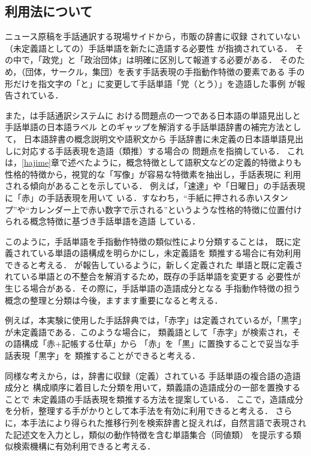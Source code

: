 \subsection {利用法について}

ニュース原稿を手話通訳する現場サイドから，市販の辞書に収録
されていない（未定義語としての）手話単語を新たに造語する必要性
が指摘されている\cite{Shigaki1991}．
その中で，「政党」と「政治団体」は明確に区別して報道する必要がある．
そのため，（団体，サークル，集団）を表す手話表現の手指動作特徴の要素である
手の形だけを指文字の「と」に変更して手話単語「党（とう）」を造語した事例
が報告されている．

また，\cite{Tokuda1998}は手話通訳システムに
おける問題点の一つである日本語の単語見出しと手話単語の日本語ラベル
とのギャップを解消する手話単語辞書の補完方法として，
日本語辞書の概念説明文や語釈文から
手話辞書に未定義の日本語単語見出しに対応する手話表現を造語（類推）する場合の
問題点を指摘している．
これは，\ref{hajime}章で述べたように，概念特徴として語釈文などの定義的特徴よりも
性格的特徴から，視覚的な「写像」が容易な特徴素を抽出し，手話表現に
利用される傾向があることを示している．
例えば，「速達」や「日曜日」の手話表現に「赤」の手話表現を用いて
いる．すなわち，``手紙に押される赤いスタンプ''や``カレンダー上で赤い数字で示される''というような性格的特徴に位置付けられる概念特徴に基づき手話単語を造語
している．

このように，手話単語を手指動作特徴の類似性により分類することは，
既に定義されている単語の語構成を明らかにし，未定義語を
類推する場合に有効利用できると考える．
\cite{Honna1994}が報告しているように，新しく定義された
単語と既に定義されている単語との不整合を解消するため，既存の手話単語を変更する
必要性が生じる場合がある．その際に，手話単語の造語成分となる
手指動作特徴の担う概念の整理と分類は今後，ますます重要になると考える．

例えば，本実験に使用した手話辞典では，「赤字」は定義されているが，「黒字」が未定義語である．このような場合に，
類義語として「赤字」が検索され，その語構成「赤+記帳する仕草」から
「赤」を「黒」に置換することで妥当な手話表現「黒字」\cite{Ito1982}を
類推することができると考える．

同様な考えから，\cite{Adachi1993}は，辞書に収録（定義）されている
手話単語の複合語の造語成分と
構成順序に着目した分類を用いて，類義語の造語成分の一部を置換することで
未定義語の手話表現を類推する方法を提案している．
ここで，造語成分を分析，整理する手がかりとして本手法を有効に利用できると考える．
さらに，本手法により得られた推移行列を検索辞書と捉えれば，自然言語で表現された記述文を入力とし，類似の動作特徴を含む単語集合（同値類）
を提示する類似検索機構に有効利用できると考える．

